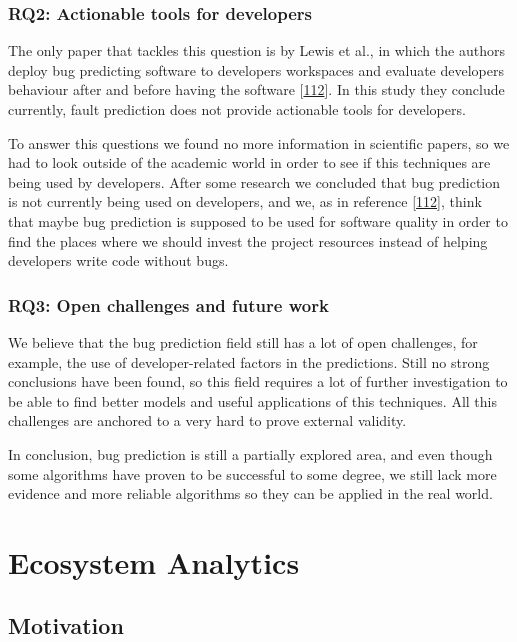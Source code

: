 \documentclass[]{book}
\begin{document}
\subsection{RQ2: Actionable tools for
developers}\label{rq2-actionable-tools-for-developers}

The only paper that tackles this question is by Lewis et al., in which
the authors deploy bug predicting software to developers workspaces and
evaluate developers behaviour after and before having the software
{[}\protect\hyperlink{ref-Lewis2013}{112}{]}. In this study they
conclude currently, fault prediction does not provide actionable tools
for developers.

To answer this questions we found no more information in scientific
papers, so we had to look outside of the academic world in order to see
if this techniques are being used by developers. After some research we
concluded that bug prediction is not currently being used on developers,
and we, as in reference {[}\protect\hyperlink{ref-Lewis2013}{112}{]},
think that maybe bug prediction is supposed to be used for software
quality in order to find the places where we should invest the project
resources instead of helping developers write code without bugs.

\subsection{RQ3: Open challenges and future
work}\label{rq3-open-challenges-and-future-work}

We believe that the bug prediction field still has a lot of open
challenges, for example, the use of developer-related factors in the
predictions. Still no strong conclusions have been found, so this field
requires a lot of further investigation to be able to find better models
and useful applications of this techniques. All this challenges are
anchored to a very hard to prove external validity.

In conclusion, bug prediction is still a partially explored area, and
even though some algorithms have proven to be successful to some degree,
we still lack more evidence and more reliable algorithms so they can be
applied in the real world.

\chapter{Ecosystem Analytics}\label{ecosystem-analytics}

\section{Motivation}\label{motivation-3}
\end{document}
